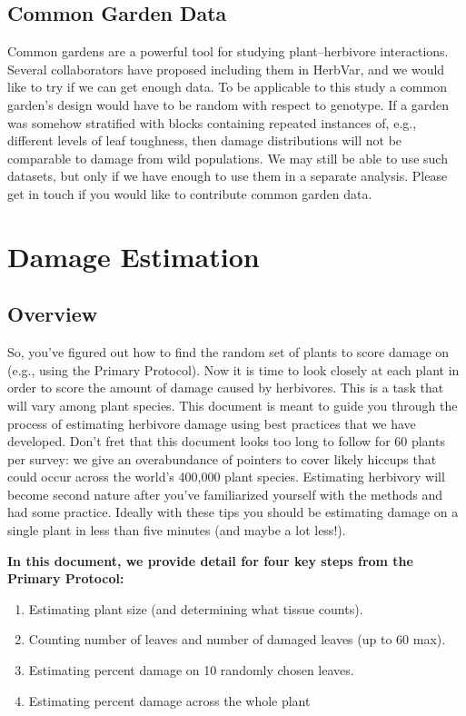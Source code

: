 \documentclass[
  letterpaper,
  oneside,
  open=any]{scrbook}
\providecommand{\tightlist}{%
  \setlength{\itemsep}{0pt}\setlength{\parskip}{0pt}}\usepackage{longtable,booktabs,array}
\begin{document}
\section{Common Garden Data}\label{common-garden-data}

Common gardens are a powerful tool for studying plant--herbivore
interactions. Several collaborators have proposed including them in
HerbVar, and we would like to try if we can get enough data. To be
applicable to this study a common garden's design would have to be
random with respect to genotype. If a garden was somehow stratified with
blocks containing repeated instances of, e.g., different levels of leaf
toughness, then damage distributions will not be comparable to damage
from wild populations. We may still be able to use such datasets, but
only if we have enough to use them in a separate analysis. Please get in
touch if you would like to contribute common garden data.

\chapter{Damage Estimation}\label{sec-damage}

\section{Overview}\label{overview}

So, you've figured out how to find the random set of plants to score
damage on (e.g., using the Primary Protocol). Now it is time to look
closely at each plant in order to score the amount of damage caused by
herbivores. This is a task that will vary among plant species. This
document is meant to guide you through the process of estimating
herbivore damage using best practices that we have developed. Don't fret
that this document looks too long to follow for 60 plants per survey: we
give an overabundance of pointers to cover likely hiccups that could
occur across the world's 400,000 plant species. Estimating herbivory
will become second nature after you've familiarized yourself with the
methods and had some practice. Ideally with these tips you should be
estimating damage on a single plant in less than five minutes (and maybe
a lot less!).

\textbf{In this document, we provide detail for four key steps from the
Primary Protocol:}

\begin{enumerate}
\def\labelenumi{\arabic{enumi}.}
\tightlist
\item
  Estimating plant size (and determining what tissue counts).
\item
  Counting number of leaves and number of damaged leaves (up to 60 max).
\item
  Estimating percent damage on 10 randomly chosen leaves.
\item
  Estimating percent damage across the whole plant
\end{enumerate}
\end{document}
